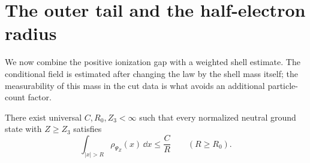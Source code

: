 \section{The outer tail and the half-electron radius}\label{a:sec:tail}

We now combine the positive ionization gap with a weighted shell
estimate.  The conditional field is estimated after changing the law
by the shell mass itself; the measurability of this mass in the cut
data is what avoids an additional particle-count factor.

\begin{proposition}\label{a:prop:tail-mass}
There exist universal $C,R_0,Z_3<\infty$ such that every normalized
neutral ground state with $Z\ge Z_3$ satisfies
\begin{equation}\label{a:eq:tail-mass}
 \int_{|x|>R}\rho_{\Psi_Z}(x)\,\dd x\le\frac C R
 \qquad(R\ge R_0).
\end{equation}
\end{proposition}

